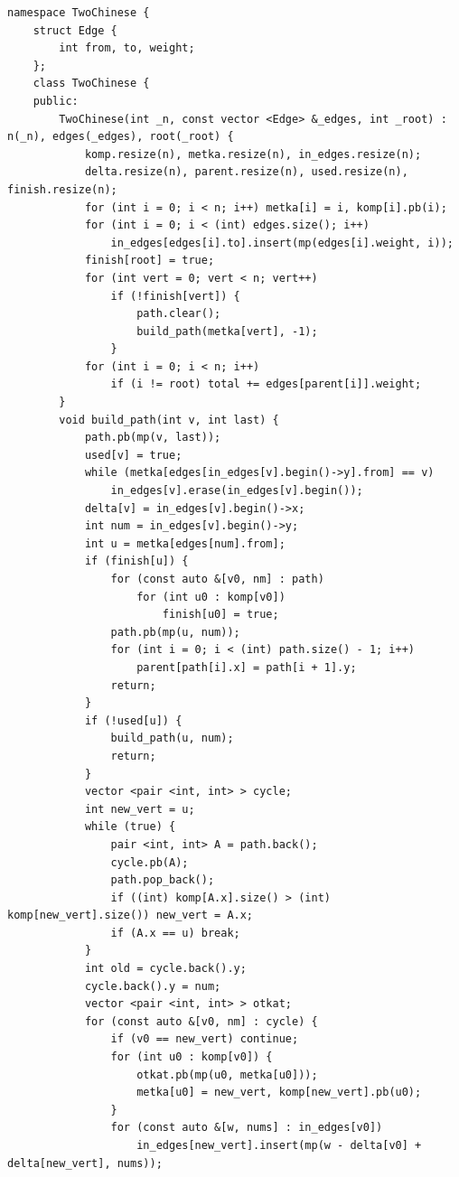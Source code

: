 \documentclass[10pt, portrait,letterpaper]{article}
\begin{document}
\begin{verbatim}
namespace TwoChinese {
    struct Edge {
        int from, to, weight;
    };
    class TwoChinese {
    public:
        TwoChinese(int _n, const vector <Edge> &_edges, int _root) : n(_n), edges(_edges), root(_root) {
            komp.resize(n), metka.resize(n), in_edges.resize(n);
            delta.resize(n), parent.resize(n), used.resize(n), finish.resize(n);
            for (int i = 0; i < n; i++) metka[i] = i, komp[i].pb(i);
            for (int i = 0; i < (int) edges.size(); i++)
                in_edges[edges[i].to].insert(mp(edges[i].weight, i));
            finish[root] = true;
            for (int vert = 0; vert < n; vert++)
                if (!finish[vert]) {
                    path.clear();
                    build_path(metka[vert], -1);
                }
            for (int i = 0; i < n; i++)
                if (i != root) total += edges[parent[i]].weight;
        }
        void build_path(int v, int last) {
            path.pb(mp(v, last));
            used[v] = true;
            while (metka[edges[in_edges[v].begin()->y].from] == v)
                in_edges[v].erase(in_edges[v].begin());
            delta[v] = in_edges[v].begin()->x;
            int num = in_edges[v].begin()->y;
            int u = metka[edges[num].from];
            if (finish[u]) {
                for (const auto &[v0, nm] : path)
                    for (int u0 : komp[v0])
                        finish[u0] = true;
                path.pb(mp(u, num));
                for (int i = 0; i < (int) path.size() - 1; i++)
                    parent[path[i].x] = path[i + 1].y;
                return;	
            }
            if (!used[u]) {
                build_path(u, num);
                return;
            }
            vector <pair <int, int> > cycle;
            int new_vert = u;
            while (true) {
                pair <int, int> A = path.back();
                cycle.pb(A);
                path.pop_back();
                if ((int) komp[A.x].size() > (int) komp[new_vert].size()) new_vert = A.x;
                if (A.x == u) break;
            }
            int old = cycle.back().y;
            cycle.back().y = num;
            vector <pair <int, int> > otkat;
            for (const auto &[v0, nm] : cycle) {
                if (v0 == new_vert) continue;
                for (int u0 : komp[v0]) {
                    otkat.pb(mp(u0, metka[u0]));
                    metka[u0] = new_vert, komp[new_vert].pb(u0);
                }
                for (const auto &[w, nums] : in_edges[v0])
                    in_edges[new_vert].insert(mp(w - delta[v0] + delta[new_vert], nums));

\end{verbatim}
\end{document}
